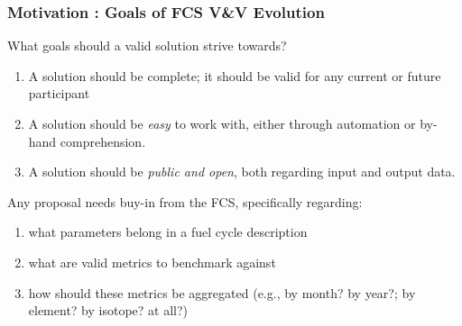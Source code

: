 \begin{frame}[ctb!]
  \frametitle{Motivation : Goals of FCS V\&V Evolution}
  What goals should a valid solution strive towards?
  \begin{enumerate}
    \item A solution should be complete; it should be valid for any current or
      future participant
    \item A solution should be \textit{easy} to work with, either through
      automation or by-hand comprehension.
    \item A solution should be \textit{public and open}, both regarding input
      and output data.
  \end{enumerate}

  Any proposal needs buy-in from the FCS, specifically regarding:
  \begin{enumerate}
    \item what parameters belong in a fuel cycle description
    \item what are valid metrics to benchmark against
    \item how should these metrics be aggregated (e.g., by month? by year?; by
      element? by isotope? at all?)
  \end{enumerate}
\end{frame}
